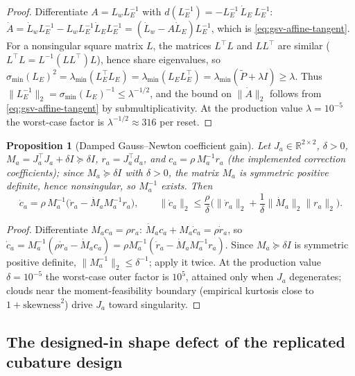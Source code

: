 \documentclass[11pt]{article}
\newtheorem{proposition}{Proposition}[section]
\theoremstyle{definition}
\theoremstyle{remark}
\begin{document}
\begin{proof}
Differentiate $A=L_wL_E^{-1}$ with
$d(L_E^{-1})=-L_E^{-1}\,\dot L_E\,L_E^{-1}$:
$\dot A=\dot L_wL_E^{-1}-L_wL_E^{-1}\dot L_EL_E^{-1}
=(\dot L_w-A\dot L_E)L_E^{-1}$, which is \eqref{eq:gsv-affine-tangent}.
For a nonsingular square matrix $L$, the matrices $L^{\top}L$ and
$L L^{\top}$ are similar ($L^{\top}L=L^{-1}(LL^{\top})L$), hence share
eigenvalues, so
$\sigma_{\min}(L_E)^2=\lambda_{\min}(L_E^{\top}L_E)
=\lambda_{\min}(L_EL_E^{\top})
=\lambda_{\min}(\widetilde P+\lambda I)\ge\lambda$.
Thus $\lVert L_E^{-1}\rVert_2=\sigma_{\min}(L_E)^{-1}\le\lambda^{-1/2}$,
and the bound on $\lVert\dot A\rVert_2$ follows from
\eqref{eq:gsv-affine-tangent} by submultiplicativity.  At the production
value $\lambda=10^{-5}$ the worst-case factor is
$\lambda^{-1/2}\approx316$ per reset.
\end{proof}

\begin{proposition}[Damped Gauss--Newton coefficient gain]
\label{prop:gsv-gn-gain}
Let $J_a\in\mathbb{R}^{2\times2}$, $\delta>0$,
$M_a=J_a^{\top}J_a+\delta I\succeq\delta I$, $r_a=J_a^{\top}d_a$, and
$c_a=\rho\,M_a^{-1}r_a$ (the implemented correction coefficients); since
$M_a\succeq\delta I$ with $\delta>0$, the matrix $M_a$ is symmetric positive
definite, hence nonsingular, so $M_a^{-1}$ exists.  Then
\begin{equation}
\label{eq:gsv-gn-tangent}
 \dot c_a=\rho\,M_a^{-1}\big(\dot r_a-\dot M_aM_a^{-1}r_a\big),
 \qquad
 \lVert\dot c_a\rVert_2
 \le\frac{\rho}{\delta}\Big(\lVert\dot r_a\rVert_2
 +\frac{1}{\delta}\lVert\dot M_a\rVert_2\lVert r_a\rVert_2\Big).
\end{equation}
\end{proposition}

\begin{proof}
Differentiate $M_ac_a=\rho r_a$:
$\dot M_ac_a+M_a\dot c_a=\rho\dot r_a$, so
$\dot c_a=M_a^{-1}(\rho\dot r_a-\dot M_ac_a)
=\rho M_a^{-1}(\dot r_a-\dot M_aM_a^{-1}r_a)$.
Since $M_a\succeq\delta I$ is symmetric positive definite,
$\lVert M_a^{-1}\rVert_2\le\delta^{-1}$; apply it twice.  At the production
value $\delta=10^{-5}$ the worst-case outer factor is $10^{5}$, attained
only when $J_a$ degenerates; clouds near the moment-feasibility boundary
(empirical kurtosis close to $1+\text{skewness}^2$) drive $J_a$ toward
singularity.
\end{proof}

\subsection{The designed-in shape defect of the replicated cubature design}
\end{document}
